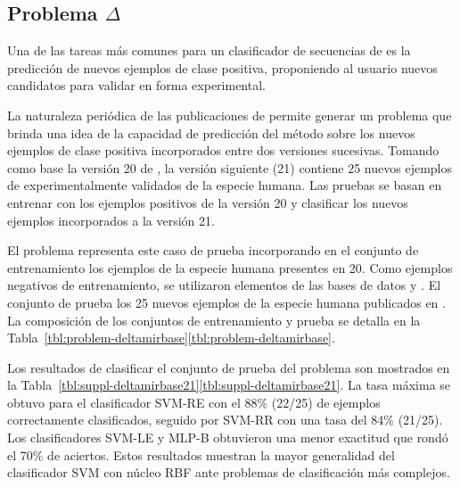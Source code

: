 %
%
\subsection{Problema $\mathbf{\mathsf{\Delta}}$\mirbase}
%
Una de las tareas más comunes para un clasificador de secuencias de
 es la predicción de nuevos ejemplos de clase positiva,
proponiendo al usuario nuevos {candidatos} para validar en forma
experimental.

La naturaleza periódica de las publicaciones de \work\mirbase{}
permite generar un problema que brinda una idea de la capacidad de
predicción del método sobre los nuevos ejemplos de clase positiva
incorporados entre dos versiones sucesivas.
Tomando como base la versión 20 de \work\mirbase, la versión siguiente
(21) contiene 25 nuevos ejemplos de  experimentalmente
validados de la especie humana.
Las pruebas se basan en entrenar con los ejemplos positivos de la
versión 20 y clasificar los nuevos ejemplos incorporados a la versión
21.

El problema \prob\deltamirbase{} representa este caso de prueba
incorporando en el conjunto de entrenamiento  los ejemplos de
la especie humana presentes en \work\mirbase{} 20.
Como ejemplos negativos de entrenamiento, se utilizaron elementos de
las bases de datos  \cite{xue} y 
\cite{batuwita}.
El conjunto de prueba los 25 nuevos ejemplos de la especie humana
publicados en \work{}.
La composición de los conjuntos de entrenamiento y prueba se detalla en
la \iflatexml{}Tabla~\ref{tbl:problem-deltamirbase}\else\autoref{tbl:problem-deltamirbase}\fi.

Los resultados de clasificar el conjunto de prueba del problema
\prob\deltamirbase{} son mostrados en la
\iflatexml{}Tabla~\ref{tbl:suppl-deltamirbase21}\else\autoref{tbl:suppl-deltamirbase21}\fi.
La tasa máxima se obtuvo para el clasificador SVM-RE con el 88\%
(22/25) de ejemplos correctamente clasificados, seguido por SVM-RR con
una tasa del 84\% (21/25).
Los clasificadores SVM-LE y MLP-B obtuvieron una menor exactitud que
rondó el 70\% de aciertos.
Estos resultados muestran la mayor generalidad del clasificador SVM
con núcleo RBF ante problemas de clasificación más complejos.
